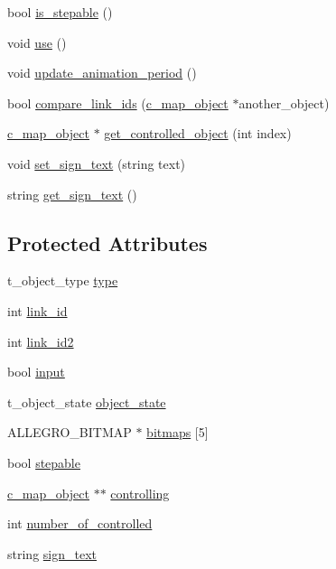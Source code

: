 \begin{DoxyCompactItemize}
bool \hyperlink{classc__map__object_ad234b9747a048875128fba677136ef4f}{is\-\_\-stepable} ()
\item 
void \hyperlink{classc__map__object_a38d45962c3bbc6ae6f2572811be93214}{use} ()
\item 
void \hyperlink{classc__map__object_a2df801781fdad9a4b42a78ff5b9c8558}{update\-\_\-animation\-\_\-period} ()
\item 
bool \hyperlink{classc__map__object_aad8f98a195de734d0cfa94c93fc94406}{compare\-\_\-link\-\_\-ids} (\hyperlink{classc__map__object}{c\-\_\-map\-\_\-object} $\ast$another\-\_\-object)
\item 
\hyperlink{classc__map__object}{c\-\_\-map\-\_\-object} $\ast$ \hyperlink{classc__map__object_a63cc574e5972757e2a399a6ddc63efc3}{get\-\_\-controlled\-\_\-object} (int index)
\item 
void \hyperlink{classc__map__object_a577ec7d3dd41b29e6c5f554d6c3d600f}{set\-\_\-sign\-\_\-text} (string text)
\item 
string \hyperlink{classc__map__object_ad5c4284b4e7b5a824ae5734f33f59f35}{get\-\_\-sign\-\_\-text} ()
\end{DoxyCompactItemize}
\subsection*{Protected Attributes}
\begin{DoxyCompactItemize}
\item 
t\-\_\-object\-\_\-type \hyperlink{classc__map__object_a9d47ec81d25e5785311adc675ea6377d}{type}
\item 
int \hyperlink{classc__map__object_a4563fd9421b83b1349e4e74559b22507}{link\-\_\-id}
\item 
int \hyperlink{classc__map__object_a95575848075ef4b407907eb8e5c48e3c}{link\-\_\-id2}
\item 
bool \hyperlink{classc__map__object_a67285c4371f63f7a3e31e81d89696271}{input}
\item 
t\-\_\-object\-\_\-state \hyperlink{classc__map__object_a8bde4cfd4fed11a9f01389977504a10a}{object\-\_\-state}
\item 
A\-L\-L\-E\-G\-R\-O\-\_\-\-B\-I\-T\-M\-A\-P $\ast$ \hyperlink{classc__map__object_af9e944bd38ae90bfa3f9f051ec9dd8fa}{bitmaps} \mbox{[}5\mbox{]}
\item 
bool \hyperlink{classc__map__object_a89b2a794cb8409e93493a99adfe2d311}{stepable}
\item 
\hyperlink{classc__map__object}{c\-\_\-map\-\_\-object} $\ast$$\ast$ \hyperlink{classc__map__object_af772ed08fc85de963e5cd18b403eecca}{controlling}
\item 
int \hyperlink{classc__map__object_ad03a55702a3f84a90bfa46700ab7124c}{number\-\_\-of\-\_\-controlled}
\item 
string \hyperlink{classc__map__object_a57a973ea5b89a30e3b9f9b1332197493}{sign\-\_\-text}
\end{DoxyCompactItemize}


